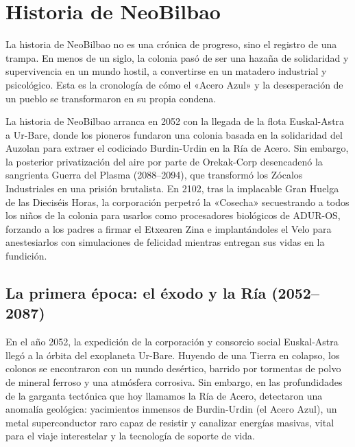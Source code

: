 \chapter{Historia de NeoBilbao}

La historia de NeoBilbao no es una crónica de progreso, sino el registro de una trampa. En menos de un siglo, la colonia pasó de ser una hazaña de solidaridad y supervivencia en un mundo hostil, a convertirse en un matadero industrial y psicológico. Esta es la cronología de cómo el «Acero Azul» y la desesperación de un pueblo se transformaron en su propia condena.

La historia de NeoBilbao arranca en 2052 con la llegada de la flota Euskal-Astra a Ur-Bare, donde los pioneros fundaron una colonia basada en la solidaridad del Auzolan para extraer el codiciado Burdin-Urdin en la Ría de Acero. Sin embargo, la posterior privatización del aire por parte de Orekak-Corp desencadenó la sangrienta Guerra del Plasma (2088--2094), que transformó los Zócalos Industriales en una prisión brutalista. En 2102, tras la implacable Gran Huelga de las Dieciséis Horas, la corporación perpetró la «Cosecha» secuestrando a todos los niños de la colonia para usarlos como procesadores biológicos de ADUR-OS, forzando a los padres a firmar el Etxearen Zina e implantándoles el Velo para anestesiarlos con simulaciones de felicidad mientras entregan sus vidas en la fundición.


\section{La primera época: el éxodo y la Ría (2052--2087)}

En el año 2052, la expedición de la corporación y consorcio social Euskal-Astra llegó a la órbita del exoplaneta Ur-Bare. Huyendo de una Tierra en colapso, los colonos se encontraron con un mundo desértico, barrido por tormentas de polvo de mineral ferroso y una atmósfera corrosiva. Sin embargo, en las profundidades de la garganta tectónica que hoy llamamos la Ría de Acero, detectaron una anomalía geológica: yacimientos inmensos de Burdin-Urdin (el Acero Azul), un metal superconductor raro capaz de resistir y canalizar energías masivas, vital para el viaje interestelar y la tecnología de soporte de vida.


